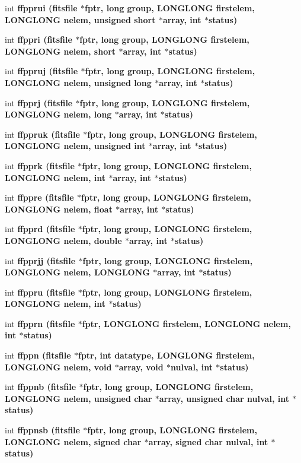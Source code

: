 \begin{CompactItemize}
\item 
int \bf{ffpprui} (\bf{fitsfile} $\ast$fptr, long group, \bf{LONGLONG} firstelem, \bf{LONGLONG} nelem, unsigned short $\ast$array, int $\ast$status)
\item 
int \bf{ffppri} (\bf{fitsfile} $\ast$fptr, long group, \bf{LONGLONG} firstelem, \bf{LONGLONG} nelem, short $\ast$array, int $\ast$status)
\item 
int \bf{ffppruj} (\bf{fitsfile} $\ast$fptr, long group, \bf{LONGLONG} firstelem, \bf{LONGLONG} nelem, unsigned long $\ast$array, int $\ast$status)
\item 
int \bf{ffpprj} (\bf{fitsfile} $\ast$fptr, long group, \bf{LONGLONG} firstelem, \bf{LONGLONG} nelem, long $\ast$array, int $\ast$status)
\item 
int \bf{ffppruk} (\bf{fitsfile} $\ast$fptr, long group, \bf{LONGLONG} firstelem, \bf{LONGLONG} nelem, unsigned int $\ast$array, int $\ast$status)
\item 
int \bf{ffpprk} (\bf{fitsfile} $\ast$fptr, long group, \bf{LONGLONG} firstelem, \bf{LONGLONG} nelem, int $\ast$array, int $\ast$status)
\item 
int \bf{ffppre} (\bf{fitsfile} $\ast$fptr, long group, \bf{LONGLONG} firstelem, \bf{LONGLONG} nelem, float $\ast$array, int $\ast$status)
\item 
int \bf{ffpprd} (\bf{fitsfile} $\ast$fptr, long group, \bf{LONGLONG} firstelem, \bf{LONGLONG} nelem, double $\ast$array, int $\ast$status)
\item 
int \bf{ffpprjj} (\bf{fitsfile} $\ast$fptr, long group, \bf{LONGLONG} firstelem, \bf{LONGLONG} nelem, \bf{LONGLONG} $\ast$array, int $\ast$status)
\item 
int \bf{ffppru} (\bf{fitsfile} $\ast$fptr, long group, \bf{LONGLONG} firstelem, \bf{LONGLONG} nelem, int $\ast$status)
\item 
int \bf{ffpprn} (\bf{fitsfile} $\ast$fptr, \bf{LONGLONG} firstelem, \bf{LONGLONG} nelem, int $\ast$status)
\item 
int \bf{ffppn} (\bf{fitsfile} $\ast$fptr, int \bf{datatype}, \bf{LONGLONG} firstelem, \bf{LONGLONG} nelem, void $\ast$array, void $\ast$nulval, int $\ast$status)
\item 
int \bf{ffppnb} (\bf{fitsfile} $\ast$fptr, long group, \bf{LONGLONG} firstelem, \bf{LONGLONG} nelem, unsigned char $\ast$array, unsigned char nulval, int $\ast$status)
\item 
int \bf{ffppnsb} (\bf{fitsfile} $\ast$fptr, long group, \bf{LONGLONG} firstelem, \bf{LONGLONG} nelem, signed char $\ast$array, signed char nulval, int $\ast$status)

\end{CompactItemize}
